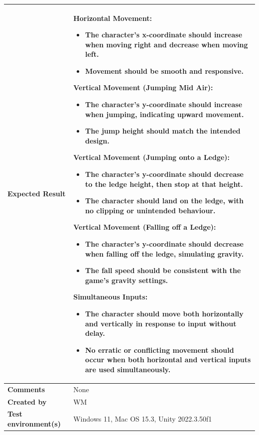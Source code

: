 \documentclass[11pt, a4paper]{article}
\begin{document}
\begin{center}
\begin{tabularx}{\linewidth}{|>{\raggedright\arraybackslash}m{4cm}|X|}
    \hline
    \textbf{Expected Result} &
     \textbf{Horizontal Movement:}
    \begin{itemize}
        \item The character’s x-coordinate should increase when moving right and decrease when moving left.
        \item Movement should be smooth and responsive.
    \end{itemize}
    \textbf{Vertical Movement (Jumping Mid Air):}
    \begin{itemize}
        \item The character’s y-coordinate should increase when jumping, indicating upward movement.
        \item The jump height should match the intended design.
    \end{itemize}
    \textbf{Vertical Movement (Jumping onto a Ledge):}
    \begin{itemize}
        \item The character’s y-coordinate should decrease to the ledge height, then stop at that height.
        \item The character should land on the ledge, with no clipping or unintended behaviour.
    \end{itemize}
    \textbf{Vertical Movement (Falling off a Ledge):}
    \begin{itemize}
        \item The character’s y-coordinate should decrease when falling off the ledge, simulating gravity.
        \item The fall speed should be consistent with the game’s gravity settings.
    \end{itemize}
    \textbf{Simultaneous Inputs:}
    \begin{itemize}
        \item The character should move both horizontally and vertically in response to input without delay.
        \item No erratic or conflicting movement should occur when both horizontal and vertical inputs are used simultaneously.
    \end{itemize}
    \\
    \hline
    \textbf{Comments} & None \\
    \hline
    \textbf{Created by} & WM \\
    \hline
    \textbf{Test environment(s)} & Windows 11, Mac OS 15.3, Unity 2022.3.50f1 \\
    \hline
\end{tabularx}
\end{center}
\end{document}
